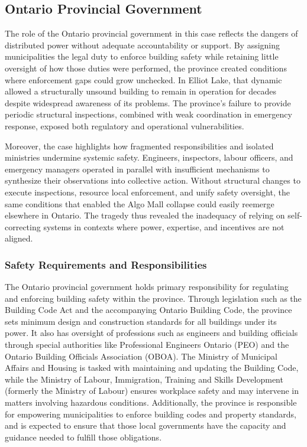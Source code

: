 \documentclass[12pt]{article}
\begin{document}
\subsection{Ontario Provincial Government}
The role of the Ontario provincial government in this case reflects the dangers of distributed power without adequate accountability or support. By assigning municipalities the legal duty to enforce building safety while retaining little oversight of how those duties were performed, the province created conditions where enforcement gaps could grow unchecked. In Elliot Lake, that dynamic allowed a structurally unsound building to remain in operation for decades despite widespread awareness of its problems. The province's failure to provide periodic structural inspections, combined with weak coordination in emergency response, exposed both regulatory and operational vulnerabilities.

Moreover, the case highlights how fragmented responsibilities and isolated ministries undermine systemic safety. Engineers, inspectors, labour officers, and emergency managers operated in parallel with insufficient mechanisms to synthesize their observations into collective action. Without structural changes to execute inspections, resource local enforcement, and unify safety oversight, the same conditions that enabled the Algo Mall collapse could easily reemerge elsewhere in Ontario. The tragedy thus revealed the inadequacy of relying on self-correcting systems in contexts where power, expertise, and incentives are not aligned.

\subsubsection*{Safety Requirements and Responsibilities}
The Ontario provincial government holds primary responsibility for regulating and enforcing building safety within the province. Through legislation such as the Building Code Act and the accompanying Ontario Building Code, the province sets minimum design and construction standards for all buildings under its power. It also has oversight of professions such as engineers and building officials through special authorities like Professional Engineers Ontario (PEO) and the Ontario Building Officials Association (OBOA). The Ministry of Municipal Affairs and Housing is tasked with maintaining and updating the Building Code, while the Ministry of Labour, Immigration, Training and Skills Development (formerly the Ministry of Labour) ensures workplace safety and may intervene in matters involving hazardous conditions. Additionally, the province is responsible for empowering municipalities to enforce building codes and property standards, and is expected to ensure that those local governments have the capacity and guidance needed to fulfill those obligations.
\end{document}

